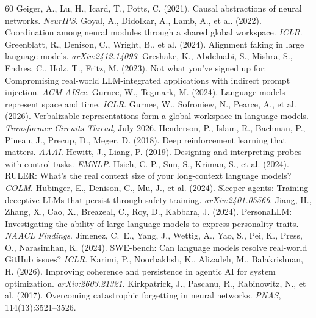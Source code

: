 \documentclass[11pt]{article}
\begin{document}
\begin{thebibliography}{60}
 Geiger, A., Lu, H., Icard, T., Potts, C. (2021). Causal abstractions of neural networks. \emph{NeurIPS}.
 Goyal, A., Didolkar, A., Lamb, A., et al. (2022). Coordination among neural modules through a shared global workspace. \emph{ICLR}.
 Greenblatt, R., Denison, C., Wright, B., et al. (2024). Alignment faking in large language models. \emph{arXiv:2412.14093}.
 Greshake, K., Abdelnabi, S., Mishra, S., Endres, C., Holz, T., Fritz, M. (2023). Not what you've signed up for: Compromising real-world LLM-integrated applications with indirect prompt injection. \emph{ACM AISec}.
 Gurnee, W., Tegmark, M. (2024). Language models represent space and time. \emph{ICLR}.
 Gurnee, W., Sofroniew, N., Pearce, A., et al. (2026). Verbalizable representations form a global workspace in language models. \emph{Transformer Circuits Thread}, July 2026.
 Henderson, P., Islam, R., Bachman, P., Pineau, J., Precup, D., Meger, D. (2018). Deep reinforcement learning that matters. \emph{AAAI}.
 Hewitt, J., Liang, P. (2019). Designing and interpreting probes with control tasks. \emph{EMNLP}.
 Hsieh, C.-P., Sun, S., Kriman, S., et al. (2024). RULER: What's the real context size of your long-context language models? \emph{COLM}.
 Hubinger, E., Denison, C., Mu, J., et al. (2024). Sleeper agents: Training deceptive LLMs that persist through safety training. \emph{arXiv:2401.05566}.
 Jiang, H., Zhang, X., Cao, X., Breazeal, C., Roy, D., Kabbara, J. (2024). PersonaLLM: Investigating the ability of large language models to express personality traits. \emph{NAACL Findings}.
 Jimenez, C.~E., Yang, J., Wettig, A., Yao, S., Pei, K., Press, O., Narasimhan, K. (2024). SWE-bench: Can language models resolve real-world GitHub issues? \emph{ICLR}.
 Karimi, P., Noorbakhsh, K., Alizadeh, M., Balakrishnan, H. (2026). Improving coherence and persistence in agentic AI for system optimization. \emph{arXiv:2603.21321}.
 Kirkpatrick, J., Pascanu, R., Rabinowitz, N., et al. (2017). Overcoming catastrophic forgetting in neural networks. \emph{PNAS}, 114(13):3521--3526.

\end{thebibliography}
\end{document}
